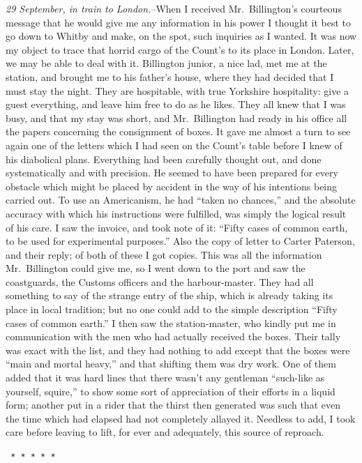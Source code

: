 \documentclass[12pt,openright]{book}
\begin{document}
\textit{29 September, in train to London.}–When I received Mr. Billington’s courteous message that he would give me any information in his power I thought it best to go down to Whitby and make, on the spot, such inquiries as I wanted. It was now my object to trace that horrid cargo of the Count’s to its place in London. Later, we may be able to deal with it. Billington junior, a nice lad, met me at the station, and brought me to his father’s house, where they had decided that I must stay the night. They are hospitable, with true Yorkshire hospitality: give a guest everything, and leave him free to do as he likes. They all knew that I was busy, and that my stay was short, and Mr. Billington had ready in his office all the papers concerning the consignment of boxes. It gave me almost a turn to see again one of the letters which I had seen on the Count’s table before I knew of his diabolical plans. Everything had been carefully thought out, and done systematically and with precision. He seemed to have been prepared for every obstacle which might be placed by accident in the way of his intentions being carried out. To use an Americanism, he had “taken no chances,” and the absolute accuracy with which his instructions were fulfilled, was simply the logical result of his care. I saw the invoice, and took note of it: “Fifty cases of common earth, to be used for experimental purposes.” Also the copy of letter to Carter Paterson, and their reply; of both of these I got copies. This was all the information Mr. Billington could give me, so I went down to the port and saw the coastguards, the Customs officers and the harbour-master. They had all something to say of the strange entry of the ship, which is already taking its place in local tradition; but no one could add to the simple description “Fifty cases of common earth.” I then saw the station-master, who kindly put me in communication with the men who had actually received the boxes. Their tally was exact with the list, and they had nothing to add except that the boxes were “main and mortal heavy,” and that shifting them was dry work. One of them added that it was hard lines that there wasn’t any gentleman “such-like as yourself, squire,” to show some sort of appreciation of their efforts in a liquid form; another put in a rider that the thirst then generated was such that even the time which had elapsed had not completely allayed it. Needless to add, I took care before leaving to lift, for ever and adequately, this source of reproach.

\texttt{   *       *       *       *       *}
\end{document}
